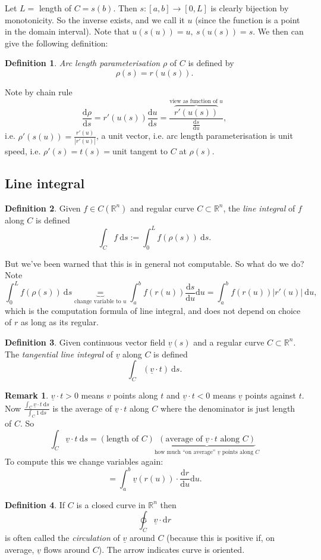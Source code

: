 \documentclass[a4paper]{article}
\theoremstyle{definition}
\newtheorem{defn}{Definition}[subsection]
\newtheorem*{remark}{Remark}
\begin{document}
Let $L=$ length of $C=s(b)$. Then $s:[a,b]\rightarrow [0,L]$ is clearly bijection by monotonicity. So the inverse exists, and we call it $u$ (since the function is a point in the domain interval). Note that $u(s(u))=u,\ s(u(s))=s.$ We then can give the following definition:
\begin{defn}
\textit{Arc length parameterisation} $\rho$ of $C$ is defined by
\[
\rho (s) = r(u(s)).
\]
\end{defn}
Note by chain rule
\[
\frac{\mathrm d \rho}{\mathrm d s} = r'(u(s)) \frac{\mathrm d u}{\mathrm d s} = \frac{\overbrace{r'(u(s))}^{\text{view as function of }u}}{\frac{\mathrm d s}{\mathrm d u}},
\]
i.e. $\rho'(s(u))=\frac{r'(u)}{|r'(u)|}$, a unit vector, i.e. arc length parameterisation is unit speed, i.e. $\rho'(s)=t(s)=$unit tangent to $C$ at $\rho(s)$.
\subsection{Line integral}
\begin{defn}
Given $f\in C(\mathbb R^n)$ and regular curve $C\subset \mathbb R^n$, the \textit{line integral} of $f$ along $C$ is defined
\[
\int_C f \ \mathrm d s := \int_0^L f(\rho(s)) \ \mathrm d s.
\]
\end{defn}
But we've been warned that this is in general not computable. So what do we do? Note
\[
\int_0^L f(\rho(s)) \ \mathrm d s \underbrace{=}_{\text{change variable to }u} \int_a^b f(r(u)) \frac{\mathrm d s}{\mathrm d u} \mathrm d u = \int_a^b f(r(u)) |r'(u)| \ \mathrm d u,
\]
which is the computation formula of line integral, and does not depend on choice of $r$ as long as its regular.

\begin{defn}
Given continuous vector field $\underline v(s)$ and a regular curve $C\subset \mathbb R^n$. The \textit{tangential line integral} of $\underline v$ along $C$ is defined
\[
\int_C (\underline v\cdot t)\ \mathrm d s.
\]
\end{defn}
\begin{remark}
$\underline v\cdot t>0$ means $v$ points along $t$ and $\underline v\cdot t<0$ means $\underline v$ points against $t$. Now $\displaystyle \frac{\int_C \underline v \cdot t \ \mathrm d s}{\int_C 1 \ \mathrm d s}$ is the average of $\underline v\cdot t$ along $C$ where the denominator is just length of $C$. So
\[
\int_C \underline v \cdot t \ \mathrm d s= (\text{length of } C) \underbrace{(\text{average of }\underline v\cdot t \text{ along }C)}_{\text{how much ``on average'' }\underline v\text{ points along }C}
\]
To compute this we change variables again:
\[
=\int_a^b \underline v(r(u)) \cdot \frac{\mathrm d r}{\mathrm d u} \mathrm d u.
\]
\end{remark}
\begin{defn}
If $C$ is a closed curve in $\mathbb R^n$ then
\[
\ointctrclockwise_C \underline v \cdot \mathrm d r
\]
is often called the \textit{circulation} of $\underline v$ around $C$ (because this is positive if, on average, $\underline v$ flows around $C$). The arrow indicates curve is oriented.
\end{defn}
\end{document}

